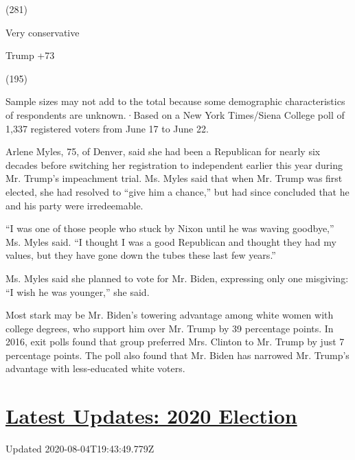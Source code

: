 (281)

Very conservative

Trump +73

(195)

Sample sizes may not add to the total because some demographic
characteristics of respondents are unknown.·Based on a New York
Times/Siena College poll of 1,337 registered voters from June 17 to June
22.

Arlene Myles, 75, of Denver, said she had been a Republican for nearly
six decades before switching her registration to independent earlier
this year during Mr. Trump's impeachment trial. Ms. Myles said that when
Mr. Trump was first elected, she had resolved to ``give him a chance,''
but had since concluded that he and his party were irredeemable.

``I was one of those people who stuck by Nixon until he was waving
goodbye,'' Ms. Myles said. ``I thought I was a good Republican and
thought they had my values, but they have gone down the tubes these last
few years.''

Ms. Myles said she planned to vote for Mr. Biden, expressing only one
misgiving: ``I wish he was younger,'' she said.

Most stark may be Mr. Biden's towering advantage among white women with
college degrees, who support him over Mr. Trump by 39 percentage points.
In 2016, exit polls found that group preferred Mrs. Clinton to Mr. Trump
by just 7 percentage points. The poll also found that Mr. Biden has
narrowed Mr. Trump's advantage with less-educated white voters.

\hypertarget{latest-updates-2020-election}{%
\section{\texorpdfstring{\href{https://www.nytimes3xbfgragh.onion/2020/08/04/us/elections/primary-election-michigan-arizona-kansas.html?action=click\&pgtype=Article\&state=default\&region=MAIN_CONTENT_1\&context=storylines_live_updates}{Latest
Updates: 2020
Election}}{Latest Updates: 2020 Election}}\label{latest-updates-2020-election}}

Updated 2020-08-04T19:43:49.779Z

